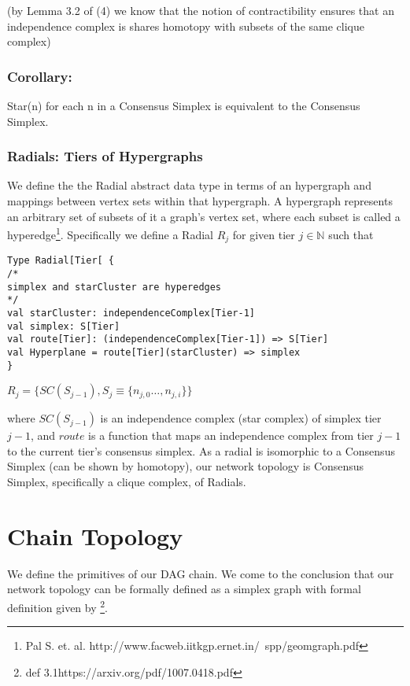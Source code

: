 \documentclass{article}
\begin{document}
\begin{center}
(by Lemma 3.2 of (4) we know that the notion of contractibility ensures that an independence complex is shares homotopy with subsets of the same clique complex)
\end{center}

\subsubsection{Corollary:}
Star(n) for each n in a Consensus Simplex is equivalent to the Consensus Simplex.

\subsubsection{Radials: Tiers of Hypergraphs}
We define the the Radial abstract data type in terms of an hypergraph and mappings between vertex sets within that hypergraph. A hypergraph represents an arbitrary set of subsets of it a graph's vertex set, where each subset is called a hyperedge\footnote{Pal S. et. al. http://www.facweb.iitkgp.ernet.in/~spp/geomgraph.pdf}. Specifically we define a Radial $R_j$ for given tier $j \in \mathbb{N}$ such that

\begin{lstlisting}
Type Radial[Tier[ {
/*
simplex and starCluster are hyperedges
*/
val starCluster: independenceComplex[Tier-1]
val simplex: S[Tier]
val route[Tier]: (independenceComplex[Tier-1]) => S[Tier]
val Hyperplane = route[Tier](starCluster) => simplex
}
\end{lstlisting}

\begin{center}
$R_j = \{SC(S_{j-1}), S_j \equiv \{n_{j,0} \dots, n_{j,i}\}\}$
\end{center}

where $SC(S_{j-1})$ is an independence complex (star complex) of simplex tier $j-1$, and $route$ is a function that maps an independence complex from tier $j-1$ to the current tier's consensus simplex. As a radial is isomorphic to a Consensus Simplex (can be shown by homotopy), our network topology is Consensus Simplex, specifically a clique complex, of Radials.

\section{Chain Topology}
We define the primitives of our DAG chain. We come to the conclusion that our network topology can be formally defined as a simplex graph with formal definition given by \footnote{def 3.1https://arxiv.org/pdf/1007.0418.pdf}.
\end{document}

